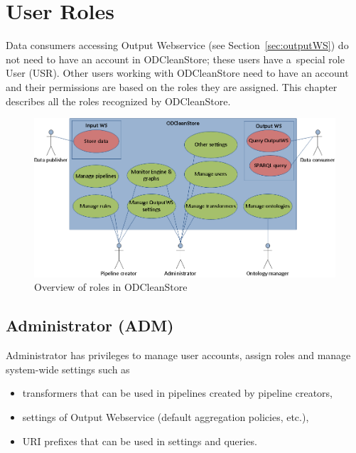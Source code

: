 
\chapter{User Roles}
\label{chap:userRoles}

Data consumers accessing Output Webservice (see Section~\ref{sec:outputWS}) do not need to have an account in ODCleanStore; these users have a~special role User (USR). Other users working with ODCleanStore need to have an account and their permissions are based on the roles they are assigned. This chapter describes all the roles recognized by ODCleanStore.

\begin{figure}[!htb]
    \centering
    \includegraphics[width=\textwidth]{images/use-cases.png}
    \caption{Overview of roles in ODCleanStore}
	\label{fig:odcsUseCases}
\end{figure}

\section[Administrator]{Administrator (ADM)}
\label{sec:adm}

	Administrator has privileges to manage user accounts, assign roles and manage system-wide settings such as
	\begin{itemize}
		\item transformers that can be used in pipelines created by pipeline creators,
		\item settings of Output Webservice (default aggregation policies, etc.),
		\item URI prefixes that can be used in settings and queries.
	\end{itemize}

